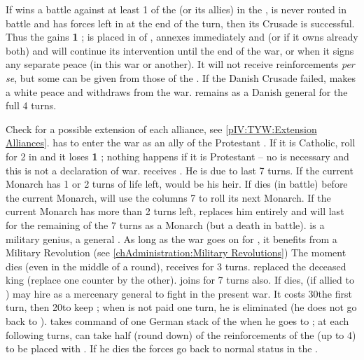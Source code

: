 \bparag If \DANdan wins a battle against at least 1 \ARMY\faceplus of the
\ligue (or its allies) in the \HRE, is never routed in battle and has forces
left in \HRE at the end of the turn, then its Crusade is successful.
\bparag Thus the \alliance gains {\bf 1} \STAB ; \DANmin is placed in \EG of
\ENG, annexes immediately \provinceLubeck and \provinceHolstein (or
\provinceMecklenburg if it owns already both) and will continue its
intervention until the end of the war, or when it signs any separate peace (in
this war or another). It will not receive reinforcements \emph{per se}, but
some can be given from those of the \alliance.
\bparag If the Danish Crusade failed, \DANmin makes a white peace and
withdraws from the war.  remains as a Danish general for
the full 4 turns.


\phevnt
\aparag Check for a possible extension of each alliance, see
\ref{pIV:TYW:Extension Alliances}.
\aparag \SUE has to enter the war as an ally of the Protestant \alliance.  If
it is Catholic, roll for 2 \REVOLT in \SUE and it loses {\bf 1} \STAB ;
nothing happens if it is Protestant -- no \CB is necessary and this is not a
declaration of war.
 \SUE receives . He is
due to last 7 turns.
\bparag If the current Monarch has 1 or 2 turns of life left,
 would be his heir. If 
dies (in battle) before the current Monarch, \SUE will use the columns 7 to
roll its next Monarch.
\bparag If the current Monarch has more than 2 turns left,  replaces him entirely and will last for the remaining of the 7
turns as a Monarch (but a death in battle).
\bparag {} is a military genius, a general
. As long as the war goes on for \SUE, it
benefits from a Military Revolution (see \ref{chAdministration:Military
  Revolutions})
\bparag[] [BLP] The moment  dies (even in the middle
of a round), \SUE receives \leaderBaner for 3 turns. \leaderBaner replaced the
deceased king (replace one counter by the other).
\label{pIV:TYW:Saxe-Weimar}
 joins \SUE for 7 turns also.
\bparag If  dies, \FRA (if allied to \SUE) may hire
 as a mercenary general to fight in the present war.  It
costs 30\ducats the first turn, then 20\ducats to keep ;
when  is not paid one turn, he is eliminated (he does not
go back to \SUE).  takes command of one German stack of
the \alliance when he goes to \FRA; at each following turns, \FRA can take
half (round down) of the reinforcements of the \alliance (up to 4\LD) to be
placed with .  If he dies the forces go back to normal
status in the \alliance.


